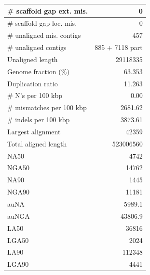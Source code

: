\documentclass[12pt,a4paper]{article}
\begin{document}
\begin{table}[ht]
\begin{center}
\begin{tabular}{|l*{1}{|r}|}
\# scaffold gap ext. mis. & 0 \\ \hline
\# scaffold gap loc. mis. & 0 \\ \hline
\# unaligned mis. contigs & 457 \\ \hline
\# unaligned contigs & 885 + 7118 part \\ \hline
Unaligned length & 29118335 \\ \hline
Genome fraction (\%) & 63.353 \\ \hline
Duplication ratio & 11.263 \\ \hline
\# N's per 100 kbp & 0.00 \\ \hline
\# mismatches per 100 kbp & 2681.62 \\ \hline
\# indels per 100 kbp & 3873.61 \\ \hline
Largest alignment & 42359 \\ \hline
Total aligned length & 523006560 \\ \hline
NA50 & 4742 \\ \hline
NGA50 & 14762 \\ \hline
NA90 & 1445 \\ \hline
NGA90 & 11181 \\ \hline
auNA & 5989.1 \\ \hline
auNGA & 43806.9 \\ \hline
LA50 & 36816 \\ \hline
LGA50 & 2024 \\ \hline
LA90 & 112348 \\ \hline
LGA90 & 4441 \\ \hline
\end{tabular}
\end{center}
\end{table}
\end{document}
